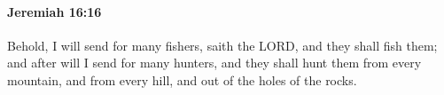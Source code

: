 
		\paragraph{Jeremiah 16:16} %
			\label{JEREMIAH-16-16}

			Behold, I will send for many fishers, saith the LORD, and they shall fish them; and after will I send for many hunters, and they shall hunt them from every mountain, and from every hill, and out of the holes of the rocks.


